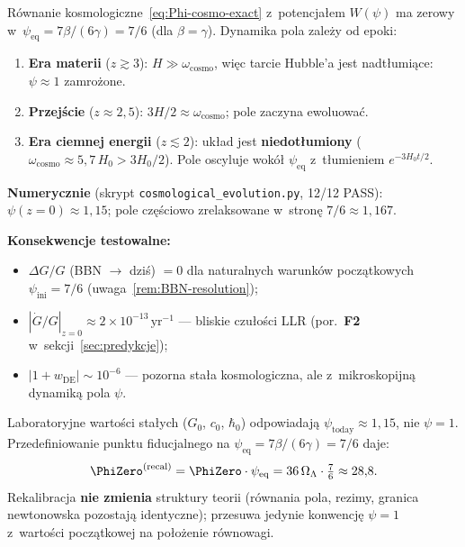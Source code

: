 \begin{remark}[Kosmologiczny atraktor $\psi_{\mathrm{eq}} = 7/6$]%
\label{rem:cosmo-attractor}
R\'ownanie kosmologiczne~\eqref{eq:Phi-cosmo-exact}
z~potencja\l{}em $W(\psi)$ ma zerowy
w~$\psi_{\mathrm{eq}} = 7\beta/(6\gamma) = 7/6$ (dla $\beta = \gamma$).
Dynamika pola zale\.zy od epoki:

\begin{enumerate}[nosep]
  \item \textbf{Era materii} ($z \gtrsim 3$):
    $H \gg \omega_{\mathrm{cosmo}}$, wi\k{e}c tarcie Hubble'a
    jest nadt\l{}umi\k{a}ce: $\psi \approx 1$ zamro\.zone.
  \item \textbf{Przej\'scie} ($z \approx 2{,}5$):
    $3H/2 \approx \omega_{\mathrm{cosmo}}$; pole zaczyna ewoluowa\'c.
  \item \textbf{Era ciemnej energii} ($z \lesssim 2$):
    uk\l{}ad jest \textbf{niedot\l{}umiony}
    ($\omega_{\mathrm{cosmo}} \approx 5{,}7\,H_0 > 3H_0/2$).
    Pole oscyluje wok\'o\l{} $\psi_{\mathrm{eq}}$
    z~t\l{}umieniem $e^{-3H_0 t/2}$.
\end{enumerate}

\noindent\textbf{Numerycznie} (skrypt
\texttt{cosmological\_evolution.py}, 12/12 PASS):
$\psi(z{=}0) \approx 1{,}15$; pole cz\k{e}\'sciowo
zrelaksowane w~stron\k{e} $7/6 \approx 1{,}167$.

\medskip\noindent\textbf{Konsekwencje testowalne:}
\begin{itemize}[nosep]
  \item $\Delta G/G$ (BBN $\to$ dzi\'s) $= 0$ dla naturalnych
    warunk\'ow pocz\k{a}tkowych $\psi_{\mathrm{ini}} = 7/6$
    (uwaga~\ref{rem:BBN-resolution});
  \item $|\dot G/G|_{z=0} \approx 2 \times 10^{-13}\,\mathrm{yr}^{-1}$
    --- bliskie czu\l{}o\'sci LLR
    (por.~\textbf{F2} w~sekcji~\ref{sec:predykcje});
  \item $|1+w_{\mathrm{DE}}| \sim 10^{-6}$
    --- pozorna sta\l{}a kosmologiczna, ale z~mikroskopijn\k{a}
    dynamik\k{a} pola $\psi$.
\end{itemize}

\end{remark}

\begin{proposition}\label{prop:recalibration}
Laboratoryjne warto\'sci sta\l{}ych ($G_0$, $c_0$, $\hbar_0$)
odpowiadaj\k{a} $\psi_{\mathrm{today}} \approx 1{,}15$, nie
$\psi = 1$. Prze\-defi\-nio\-wa\-nie punktu fiducjalnego na
$\psi_{\mathrm{eq}} = 7\beta/(6\gamma) = 7/6$ daje:
\begin{equation}\label{eq:Phi0-recal}
  \PhiZero^{(\mathrm{recal})}
  = \PhiZero \cdot \psi_{\mathrm{eq}}
  = 36\,\Omega_\Lambda \cdot \tfrac{7}{6}
  \approx 28{,}8.
\end{equation}
Rekalibracja \textbf{nie zmienia} struktury teorii (r\'ownania pola,
rezimy, granica newtonowska pozosta\-j\k{a} identyczne);
przesuwa jedynie konwencj\k{e} $\psi = 1$ z~warto\'sci pocz\k{a}tkowej
na po\l{}o\.zenie r\'ownowagi.
\end{proposition}

